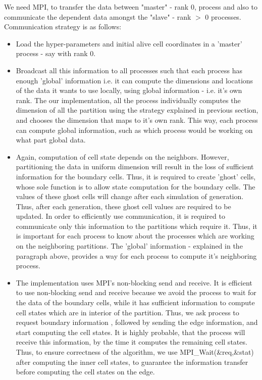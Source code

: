 \documentclass[a4paper, 10pt, conference]{IEEEtran}      %
\begin{document}
	We need MPI, to transfer the data between "master" - rank 0, process and also to communicate the dependent data amongst the "slave" - rank $>$ 0 processes. Communication strategy is as follows:\\
	\begin{itemize}
		\item  Load the hyper-parameters and initial alive cell coordinates in a 'master' process - say with rank 0.\\
		\item Broadcast all this information to all processes such that each process has enough 'global' information i.e. it can compute the dimensions and locations of the data it wants to use locally, using global information - i.e. it's own rank.  The our implementation, all the process individually computes the dimension of all the partition using the strategy explained in previous section, and chooses the dimension that maps to it's own rank. This way, each process can compute global information, such as which process would be working on what part global data.\\
		\item Again, computation of cell state depends on the neighbors. However, partitioning the data in uniform dimension will result in the loss of sufficient information for the boundary cells. Thus, it is required to create 'ghost' cells, whose sole function is to allow state computation for the boundary cells. The values of these ghost cells will change after each simulation of generation. Thus, after each generation, these ghost cell values are required to be updated. In order to efficiently use communication, it is required to communicate only this information to the partitions which require it. Thus, it is important for each process to know about the processes which are working on the neighboring partitions. The 'global' information - explained in the paragraph above, provides a way for each process to compute it's neighboring process.\\
		\item The implementation uses MPI's non-blocking send and receive. It is efficient to use non-blocking send and receive because we avoid the process to wait for the data of the boundary cells, while it has sufficient information to compute cell states which are in interior of the partition. Thus, we ask process to request boundary information , followed by sending the edge information, and start computing the cell states. It is highly probable, that the process will receive this information, by the time it computes the remaining cell states. Thus, to ensure correctness of the algorithm, we use MPI\_Wait(\&req,\&stat) after computing the inner cell states, to guarantee the information transfer before computing the cell states on the edge. 
		
	\end{itemize}
\end{document}
